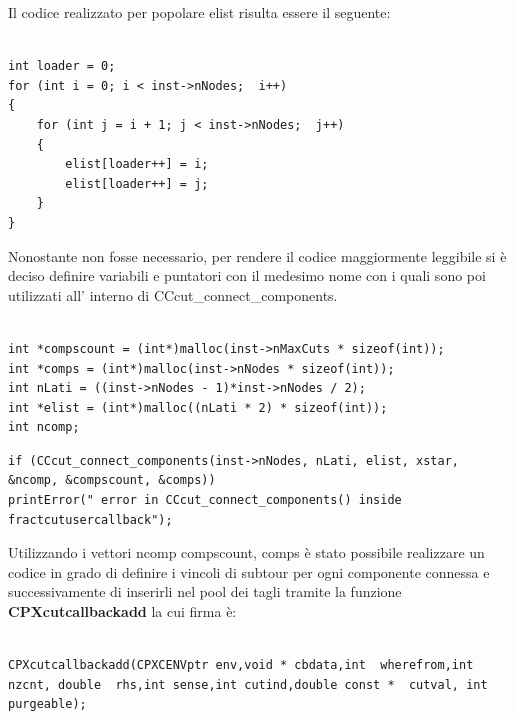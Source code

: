 \documentclass[11pt]{article}
\begin{document}
Il codice realizzato per popolare elist risulta essere il seguente:


\begin{lstlisting}

int loader = 0;
for (int i = 0; i < inst->nNodes;  i++)
{
	for (int j = i + 1; j < inst->nNodes;  j++) 
	{
	    elist[loader++] = i;
	    elist[loader++] = j;
	}
}

\end{lstlisting}

Nonostante non fosse necessario, per rendere il codice maggiormente leggibile si è deciso definire variabili e puntatori con il medesimo nome con i quali sono poi utilizzati all’ interno di CCcut_connect_components.

\begin{lstlisting}

int *compscount = (int*)malloc(inst->nMaxCuts * sizeof(int));		
int *comps = (int*)malloc(inst->nNodes * sizeof(int)); 
int nLati = ((inst->nNodes - 1)*inst->nNodes / 2);
int *elist = (int*)malloc((nLati * 2) * sizeof(int));		
int ncomp; 

\end{lstlisting}


\begin{lstlisting}
if (CCcut_connect_components(inst->nNodes, nLati, elist, xstar, &ncomp, &compscount, &comps))
printError(" error in CCcut_connect_components() inside fractcutusercallback");
\end{lstlisting}
 
Utilizzando i vettori ncomp compscount, comps è stato possibile realizzare un codice in grado di definire i vincoli di subtour per ogni componente connessa e successivamente di inserirli nel pool dei tagli tramite la funzione \textbf{CPXcutcallbackadd} la cui firma è:

\begin{lstlisting}

CPXcutcallbackadd(CPXCENVptr env,void * cbdata,int  wherefrom,int  nzcnt, double  rhs,int sense,int cutind,double const *  cutval, int purgeable);

\end{lstlisting}
\end{document}
